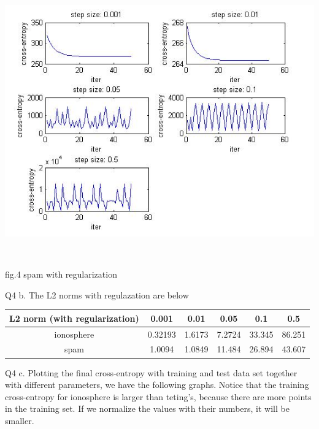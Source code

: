 \documentclass[12pt]{article}
\newenvironment{problem}[2][Problem]{\begin{trivlist}
\item[\hskip \labelsep {\bfseries #1}\hskip \labelsep {\bfseries #2}]}{\end{trivlist}}
\begin{document}
\begin{problem}{3.1 Batch Gradient Descent}
\begin{center}
		\includegraphics[height=12.5cm]{spams_gradient_descent_regularized.jpg}{\\fig.4 spam with regularization}
\end{center}
\item{Q4 b.}
The L2 norms with regulazation are below
\begin{center}
	\begin{tabular}{||c c c c c c||} 
		\hline
	   	L2 norm (with regularization) & 0.001 & 0.01 & 0.05 & 0.1 & 0.5 \\ [0.5ex] 
		\hline
		ionosphere & 0.32193 & 1.6173 & 7.2724 & 33.345 & 86.251 \\
		\hline
		spam & 1.0094 & 1.0849 & 11.484 & 26.894 & 43.607 \\
		\hline
	\end{tabular}
\end{center}
\item{Q4 c.}
Plotting the final cross-entropy with training and test data set together with different parameters, we have the following graphs. Notice that the training cross-entropy for ionosphere is larger than teting's, because there are more points in the training set. If we normalize the values with their numbers, it will be smaller.
\begin{center}

\end{center}
\end{problem}
\end{document}

